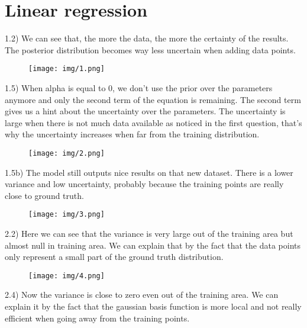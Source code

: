
\section{Linear regression}

1.2) We can see that, the more the data, the more the certainty of the results. The posterior distribution becomes way less uncertain when adding data points.

\begin{figure}[H]
  \centering
    \texttt{[image: img/1.png]}
\end{figure}

1.5) When alpha is equal to 0, we don't use the prior over the parameters anymore and only the second term of the equation is remaining. The second term gives us a hint about the uncertainty over the parameters. The uncertainty is large when there is not much data available as noticed in the first question, that's why the uncertainty increases when far from the training distribution.

\begin{figure}[H]
  \centering
    \texttt{[image: img/2.png]}
\end{figure}
 
1.5b) The model still outputs nice results on that new dataset. There is a lower variance and low uncertainty, probably because the training points are really close to ground truth.

\begin{figure}[H]
  \centering
    \texttt{[image: img/3.png]}
\end{figure}

2.2) Here we can see that the variance is very large out of the training area but almost null in training area. We can explain that by the fact that the data points only represent a small part of the ground truth distribution.

\begin{figure}[H]
  \centering
    \texttt{[image: img/4.png]}
\end{figure}

2.4) Now the variance is close to zero even out of the training area. We can explain it by the fact that the gaussian basis function is more local and not really efficient when going away from the training points.

